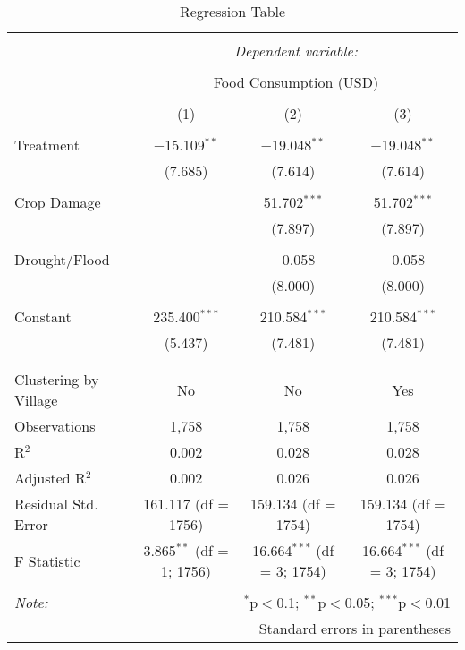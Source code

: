 
\begin{table}[!htbp] \centering 
  \caption{Regression Table} 
  \label{} 
\begin{tabular}{@{\extracolsep{5pt}}lccc} 
\\[-1.8ex]\hline 
\hline \\[-1.8ex] 
 & \multicolumn{3}{c}{\textit{Dependent variable:}} \\ 
\cline{2-4} 
\\[-1.8ex] & \multicolumn{3}{c}{Food Consumption (USD)} \\ 
\\[-1.8ex] & (1) & (2) & (3)\\ 
\hline \\[-1.8ex] 
 Treatment & $-$15.109$^{**}$ & $-$19.048$^{**}$ & $-$19.048$^{**}$ \\ 
  & (7.685) & (7.614) & (7.614) \\ 
  & & & \\ 
 Crop Damage &  & 51.702$^{***}$ & 51.702$^{***}$ \\ 
  &  & (7.897) & (7.897) \\ 
  & & & \\ 
 Drought/Flood &  & $-$0.058 & $-$0.058 \\ 
  &  & (8.000) & (8.000) \\ 
  & & & \\ 
 Constant & 235.400$^{***}$ & 210.584$^{***}$ & 210.584$^{***}$ \\ 
  & (5.437) & (7.481) & (7.481) \\ 
  & & & \\ 
\hline \\[-1.8ex] 
Clustering by Village & No & No & Yes \\ 
Observations & 1,758 & 1,758 & 1,758 \\ 
R$^{2}$ & 0.002 & 0.028 & 0.028 \\ 
Adjusted R$^{2}$ & 0.002 & 0.026 & 0.026 \\ 
Residual Std. Error & 161.117 (df = 1756) & 159.134 (df = 1754) & 159.134 (df = 1754) \\ 
F Statistic & 3.865$^{**}$ (df = 1; 1756) & 16.664$^{***}$ (df = 3; 1754) & 16.664$^{***}$ (df = 3; 1754) \\ 
\hline 
\hline \\[-1.8ex] 
\textit{Note:}  & \multicolumn{3}{r}{$^{*}$p$<$0.1; $^{**}$p$<$0.05; $^{***}$p$<$0.01} \\ 
 & \multicolumn{3}{r}{Standard errors in parentheses} \\ 
\end{tabular} 
\end{table} 
